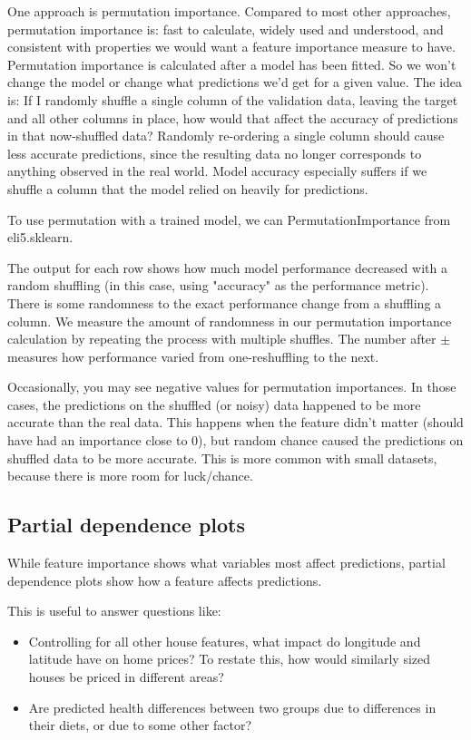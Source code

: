 \documentclass[12pt]{report}
\begin{document}
One approach is permutation importance. Compared to most other approaches, permutation importance is: fast to calculate, widely used and understood, and consistent with properties we would want a feature importance measure to have. Permutation importance is calculated after a model has been fitted. So we won't change the model or change what predictions we'd get for a given value. The idea is: If I randomly shuffle a single column of the validation data, leaving the target and all other columns in place, how would that affect the accuracy of predictions in that now-shuffled data? Randomly re-ordering a single column should cause less accurate predictions, since the resulting data no longer corresponds to anything observed in the real world. Model accuracy especially suffers if we shuffle a column that the model relied on heavily for predictions.

To use permutation with a trained model, we can PermutationImportance from eli5.sklearn.

The output for each row shows how much model performance decreased with a random shuffling (in this case, using "accuracy" as the performance metric). There is some randomness to the exact performance change from a shuffling a column. We measure the amount of randomness in our permutation importance calculation by repeating the process with multiple shuffles. The number after $\pm$ measures how performance varied from one-reshuffling to the next.

Occasionally, you may see negative values for permutation importances. In those cases, the predictions on the shuffled (or noisy) data happened to be more accurate than the real data. This happens when the feature didn't matter (should have had an importance close to 0), but random chance caused the predictions on shuffled data to be more accurate. This is more common with small datasets, because there is more room for luck/chance.

\subsection{Partial dependence plots}

While feature importance shows what variables most affect predictions, partial dependence plots show how a feature affects predictions.

This is useful to answer questions like:

\begin{itemize}
\item Controlling for all other house features, what impact do longitude and latitude have on home prices? To restate this, how would similarly sized houses be priced in different areas?
\item Are predicted health differences between two groups due to differences in their diets, or due to some other factor?
\end{itemize}
\end{document}
